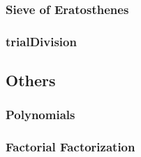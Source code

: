 \documentclass[../Notes/main.tex]{subfiles}
\begin{document}
\subsubsection{Sieve of Eratosthenes}


\subsubsection{trialDivision}


\subsection{Others}
\subsubsection{Polynomials}


\subsubsection{Factorial Factorization}

\end{document}
